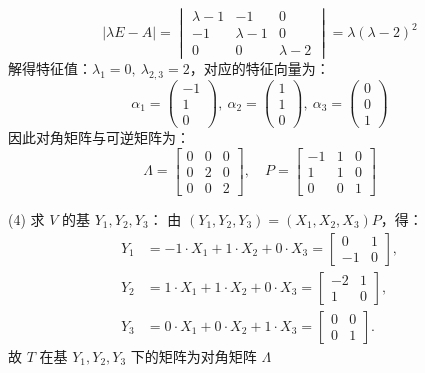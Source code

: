 \documentclass{article}
\begin{document}
\[
|\lambda E - A| = \begin{vmatrix} \lambda - 1 & -1 & 0 \\ -1 & \lambda - 1 & 0 \\ 0 & 0 & \lambda - 2 \end{vmatrix}
= \lambda(\lambda - 2)^2
\]
解得特征值：$\lambda_1 = 0,\ \lambda_{2,3} = 2$，对应的特征向量为：
\[
\alpha_1 = \begin{pmatrix} -1 \\ 1 \\ 0 \end{pmatrix},\ \alpha_2 = \begin{pmatrix} 1 \\ 1 \\ 0 \end{pmatrix},\ \alpha_3 = \begin{pmatrix} 0 \\ 0 \\ 1 \end{pmatrix}
\]
因此对角矩阵与可逆矩阵为：
\[
\Lambda = \begin{bmatrix} 0 & 0 & 0 \\ 0 & 2 & 0 \\ 0 & 0 & 2 \end{bmatrix},\quad
P = \begin{bmatrix} -1 & 1 & 0 \\ 1 & 1 & 0 \\ 0 & 0 & 1 \end{bmatrix}
\]

\vspace{1em}
\noindent (4) 求 $V$ 的基 $Y_1,Y_2,Y_3$：
由 $(Y_1,Y_2,Y_3) = (X_1,X_2,X_3)P$，得：
\[
\begin{aligned}
Y_1 &= -1\cdot X_1 + 1\cdot X_2 + 0\cdot X_3 = \begin{bmatrix} 0 & 1 \\ -1 & 0 \end{bmatrix}, \\[4pt]
Y_2 &= 1\cdot X_1 + 1\cdot X_2 + 0\cdot X_3 = \begin{bmatrix} -2 & 1 \\ 1 & 0 \end{bmatrix}, \\[4pt]
Y_3 &= 0\cdot X_1 + 0\cdot X_2 + 1\cdot X_3 = \begin{bmatrix} 0 & 0 \\ 0 & 1 \end{bmatrix}.
\end{aligned}
\]
故 $T$ 在基 $Y_1,Y_2,Y_3$ 下的矩阵为对角矩阵 $\Lambda$
\end{document}
